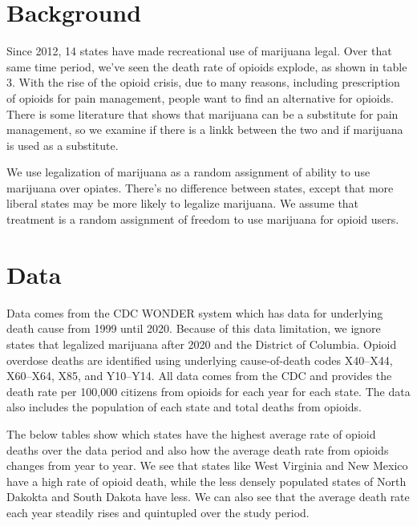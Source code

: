 \documentclass{article}
\begin{document}
\section*{Background} %

Since 2012, 14 states have made recreational use of marijuana legal. Over that same time period, we've seen the death rate of opioids explode, as shown in table 3. With the rise of the opioid crisis, due to many reasons, including prescription of opioids for pain management, people want to find an alternative for opioids. There is some literature that shows that marijuana can be a substitute for pain management, so we examine if there is a linkk between the two and if marijuana is used as a substitute. 

We use legalization of marijuana as a random assignment of ability to use marijuana over opiates. There's no difference between states, except that more liberal states may be more likely to legalize marijuana. We assume that treatment is a random assignment of freedom to use marijuana for opioid users. 





\section*{Data} %

Data comes from the CDC WONDER system which has data for underlying death cause from 1999 until 2020. Because of this data limitation, we ignore states that legalized marijuana after 2020 and the District of Columbia. Opioid overdose deaths are identified using underlying cause-of-death codes X40–X44, X60–X64, X85, and Y10–Y14. All data comes from the CDC and provides the death rate per 100,000 citizens from opioids for each year for each state. The data also includes the population of each state and total deaths from opioids. 

The below tables show which states have the highest average rate of opioid deaths over the data period and also how the average death rate from opioids changes from year to year. We see that states like West Virginia and New Mexico have a high rate of opioid death, while the less densely populated states of North Dakokta and South Dakota have less. We can also see that the average death rate each year steadily rises and quintupled over the study period. 
\end{document}
